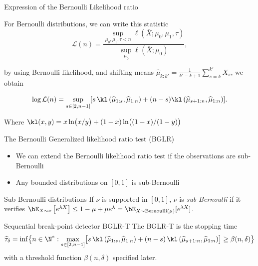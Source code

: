 \documentclass[11pt,english,ignorenonframetext,]{beamer}
\begin{document}
\begin{frame}{Expression of the Bernoulli Likelihood ratio}

  For Bernoulli distributions, we can write this statistic
  \[ \mathcal{L}(n) = \frac{\sup_{\mu_0,\mu_1,\tau < n}\ell(\overline{X} ; \mu_0,\mu_1,\tau)}{\sup_{\mu_0}\ell(\overline{X} ;\mu_0)},\]

  by using Bernoulli likelihood, and shifting means $\widehat{\mu}_{k:k'} = \frac{1}{k'-k+1} \sum_{s=k}^{k'} X_s$, we obtain

  \[ \log \mathcal{L}(n) = \sup_{s \in [2,n-1]} [ s \, \kl\left(\widehat{\mu}_{1:s},\widehat{\mu}_{1:n}\right) + (n-s) \kl\left(\widehat{\mu}_{s+1:n},\widehat{\mu}_{1:n}\right) ]. \]

  Where $\kl(x,y) =x \ln\bigl(x/y\bigr) + (1-x)\ln\bigl((1-x)/(1-y)\bigr)$

\end{frame}


\begin{frame}{The Bernoulli Generalized likelihood ratio test (BGLR)}

  \begin{itemize}
    \item
    We can extend the Bernoulli likelihood ratio test if the observations are \alert{sub-Bernoulli}

    \item
    Any bounded distributions on $[0,1]$ is sub-Bernoulli
  \end{itemize}

  \begin{block}{Sub-Bernoulli distributions}
    If $\nu$ is supported in $[0,1]$,
    $\nu$ is \emph{sub-Bernoulli} if it verifies
    $\bE_{X\sim\nu}\left[e^{\lambda X}\right] \leq  1-\mu + \mu e^\lambda = \bE_{X\sim \mathrm{Bernoulli}(\mu)} [e^{\lambda X}]$.
  \end{block}

  \pause

  \begin{block}{Sequential break-point detector BGLR-T}
    The \alert{BGLR-T} is the stopping time
    \[ \widehat{\tau}_{\delta} = \inf \bigl\{ n \in \N^* : \max_{s \in [2,n-1]} \bigl[s \, \kl\left(\widehat{\mu}_{1:s},\widehat{\mu}_{1:n}\right) + (n-s) \, \kl\left(\widehat{\mu}_{s+1:n},\widehat{\mu}_{1:n}\right)\bigr] \geq \beta(n,\delta) \bigr\} \]
    with a threshold function $\beta(n,\delta)$ specified later.
  \end{block}

\end{frame}
\end{document}

